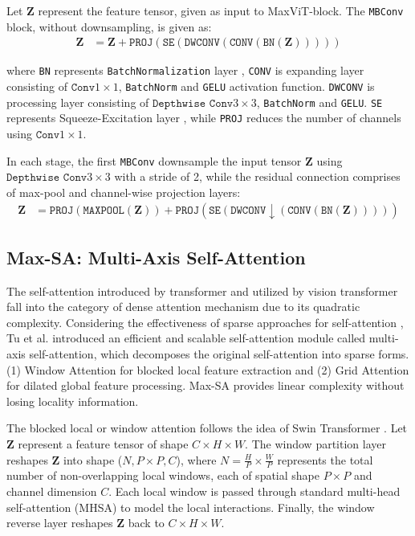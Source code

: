 \documentclass{article}
\begin{document}
Let \(\textbf{Z}\) represent the feature tensor, given as input to MaxViT-block. The \texttt{MBConv} block, without downsampling, is given as:
\begin{align}
\textbf{Z} &= \textbf{Z} + \texttt{PROJ}(\texttt{SE}(\texttt{DWCONV}(\texttt{CONV}(\texttt{BN}(\textbf{Z})))))
\end{align}

where \texttt{BN} represents \texttt{BatchNormalization} layer \cite{ioffe2015batch}, \texttt{CONV} is expanding layer consisting of \(\texttt{Conv}1\times1\), \texttt{BatchNorm} and \texttt{GELU} \cite{hendrycks2016gaussian} activation function. \texttt{DWCONV} is processing layer consisting of \(\texttt{Depthwise Conv}3\times3\), \texttt{BatchNorm} and \texttt{GELU}. \texttt{SE} represents Squeeze-Excitation layer \cite{hu2018squeeze}, while \texttt{PROJ} reduces the number of channels using \(\texttt{Conv}1\times1\).

In each stage, the first \texttt{MBConv} downsample the input tensor \(\textbf{Z}\) using \(\texttt{Depthwise Conv}3\times3\) with a stride of 2, while the residual connection comprises of max-pool and channel-wise projection layers:
\begin{align}
\textbf{Z} &= \texttt{PROJ}(\texttt{MAXPOOL}(\textbf{Z})) + \texttt{PROJ}(\texttt{SE}(\texttt{DWCONV}\downarrow(\texttt{CONV}(\texttt{BN}(\textbf{Z})))))
\end{align}

\subsection{Max-SA: Multi-Axis Self-Attention}\label{Max-SA: Multi-Axis Self-Attention}

The self-attention introduced by transformer \cite{vaswani2017attention} and utilized by vision transformer \cite{dosovitskiy2021an} fall into the category of dense attention mechanism due to its quadratic complexity. Considering the effectiveness of sparse approaches for self-attention \cite{tu2022maxim,zhao2021improved}, Tu et al. \cite{tu2022maxvit} introduced an efficient and scalable self-attention module called multi-axis self-attention, which decomposes the original self-attention into sparse forms. (1) Window Attention for blocked local feature extraction and (2) Grid Attention for dilated global feature processing. Max-SA provides linear complexity without losing locality information.

The blocked local or window attention follows the idea of Swin Transformer \cite{cao2022swin}. Let \(\textbf{Z}\) represent a feature tensor of shape \(C \times H \times W\). The window partition layer reshapes \(\textbf{Z}\) into shape  (\(N, P \times P, C\)), where \(N=\frac{H}{P} \times \frac{W}{P}\) represents the total number of non-overlapping local windows, each of spatial shape \(P \times P\) and channel dimension \(C\). Each local window is passed through standard multi-head self-attention (MHSA) to model the local interactions. Finally, the window reverse layer reshapes \(\textbf{Z}\) back to \(C \times H \times W\).
\end{document}
